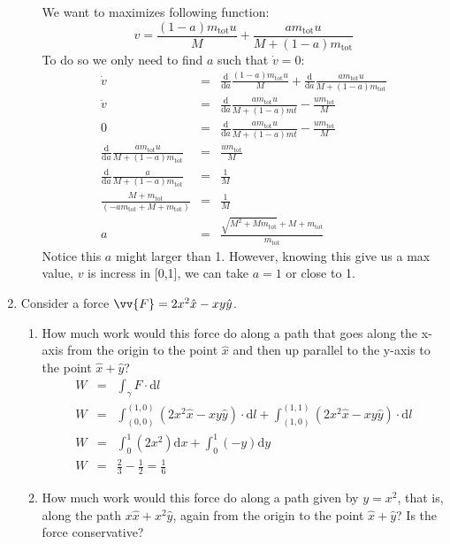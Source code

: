 \documentclass{article}
\newcommand{\de}{\mathrm{d}}
\begin{document}
\begin{enumerate}
\begin{enumerate}
        We want to maximizes following function:
        \[
        v = \frac{(1 - a)m_\text{tot} u}{M} + \frac{am_\text{tot} u}{M + (1 - a)m_\text{tot}}
        \]
        To do so we only need to find $a$ such that $\dot{v} = 0$:
        \begin{eqnarray*}
        \dot{v} &=& \frac{\de}{\de a}\frac{(1 - a)m_\text{tot} u}{M} + \frac{\de}{\de a}\frac{am_\text{tot} u}{M + (1 - a)m_\text{tot}} \\
        \dot{v} &=& \frac{\de}{\de a}\frac{am_\text{tot}u}{M+(1-a)mt} - \frac{um_\text{tot}}{M} \\
        0 &=& \frac{\de}{\de a}\frac{am_\text{tot}u}{M+(1-a)mt} - \frac{um_\text{tot}}{M} \\
        \frac{\de}{\de a}\frac{am_\text{tot}u}{M+(1-a)m_\text{tot}} &=& \frac{um_\text{tot}}{M} \\
        \frac{\de}{\de a}\frac{a}{M+(1-a)m_\text{tot}} &=& \frac{1}{M} \\
        \frac{M+m_\text{tot}}{(-am_\text{tot}+M+m_\text{tot})} &=& \frac{1}{M} \\
        a &=& \frac{\sqrt{M^2+Mm_\text{tot}}+M+m_\text{tot}}{m_\text{tot}}
        \end{eqnarray*}
        Notice this $a$ might larger than 1. However, knowing this give us a max value, $v$ is incress in [0,1], we can take $a = 1$ or close to 1.
    \end{enumerate}
    \item Consider a force $\vv{F} = 2x^2\hat{x}-xy\hat{y}$.
    \begin{enumerate}
        \item How much work would this force do along a path that goes along the x-axis from the origin to the point $\hat{x}$ and then up parallel to the y-axis to the point $\hat{x}+\hat{y}$?\\

        \begin{eqnarray*}
        W &=& \int_\gamma F \cdot \de l \\
        W &=& \int_{(0,0)}^{(1,0)} (2x^2\hat{x}-xy\hat{y}) \cdot \de l +  \int_{(1,0)}^{(1,1)} (2x^2\hat{x}-xy\hat{y}) \cdot \de l \\
        W &=& \int_0^1 (2x^2) \de x +  \int_0^1 (-y) \de y \\
        W &=& \frac{2}{3} - \frac{1}{2} = \frac{1}{6}
        \end{eqnarray*}
        \item How much work would this force do along a path given by $y = x^2$, that is, along the path $x\hat{x} + x^2\hat{y}$, again from the origin to the point $\hat{x}+\hat{y}$? Is the force conservative?\\


\end{enumerate}
\end{enumerate}
\end{document}
